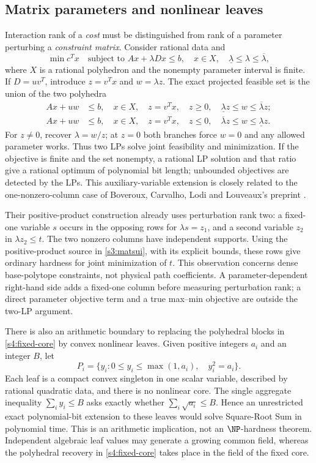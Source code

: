 \subsection{Matrix parameters and nonlinear leaves}\label{s6:parametric}
Interaction rank of a \emph{cost} must be distinguished from rank of a
parameter perturbing a \emph{constraint matrix}.
Consider rational data and
\[
 \min c^Tx\quad\text{subject to }Ax+\lambda Dx\le b,
 \quad x\in X,\quad\underline\lambda\le\lambda\le\overline\lambda,
\]
where $X$ is a rational polyhedron and the nonempty parameter interval
is finite. If $D=uv^T$, introduce $z=v^Tx$ and $w=\lambda z$.
The exact projected feasible set is the union of the two polyhedra
\begin{align*}
 Ax+uw&\le b,\quad x\in X,\quad z=v^Tx,\quad
 z\ge0,\quad\underline\lambda z\le w\le\overline\lambda z;\\
 Ax+uw&\le b,\quad x\in X,\quad z=v^Tx,\quad
 z\le0,\quad\overline\lambda z\le w\le\underline\lambda z.
\end{align*}
For $z\ne0$, recover $\lambda=w/z$; at $z=0$ both branches force
$w=0$ and any allowed parameter works. Thus two LPs solve joint
feasibility and minimization. If the objective is finite and the set
nonempty, a rational LP solution and that ratio give a rational optimum
of polynomial bit length; unbounded objectives are detected by the LPs.
This auxiliary-variable extension is closely related to the
one-nonzero-column case of Boveroux, Carvalho, Lodi and Louveaux's
preprint \cite[Section~3.3]{s6:boveroux2026}.

Their positive-product construction already uses perturbation rank two:
a fixed-one variable $s$ occurs in the opposing rows for
$\lambda s=z_1$, and a second variable $z_2$ in
$\lambda z_2\le t$. The two nonzero columns have independent supports.
Using the positive-product source in \cref{s3:matsui}, with its explicit
bounds, these rows give ordinary hardness for joint minimization of $t$.
This observation concerns dense base-polytope constraints, not physical
path coefficients. A parameter-dependent right-hand side adds a fixed-one
column before measuring perturbation rank; a direct parameter objective
term and a true max--min objective are outside the two-LP argument.

There is also an arithmetic boundary to replacing the polyhedral blocks
in \cref{s4:fixed-core} by convex nonlinear leaves. Given positive
integers $a_i$ and an integer $B$, let
\[
 P_i=\{y_i:0\le y_i\le\max(1,a_i),\quad y_i^2=a_i\}.
\]
Each leaf is a compact convex singleton in one scalar variable, described by
rational quadratic data, and there is no nonlinear core. The single
aggregate inequality $\sum_i y_i\le B$ asks exactly whether
$\sum_i\sqrt{a_i}\le B$. Hence an unrestricted exact polynomial-bit
extension to these leaves would solve Square-Root Sum in polynomial time.
This is an arithmetic implication, not an $\NP$-hardness theorem.
Independent algebraic leaf values may generate a growing common field,
whereas the polyhedral recovery in \cref{s4:fixed-core} takes place in
the field of the fixed core.


